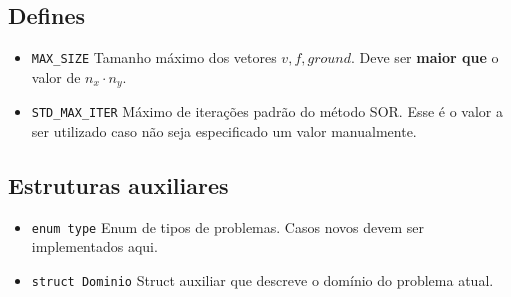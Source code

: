 \documentclass[oneside]{abntex2}
\begin{document}
\subsection{Defines}
\begin{itemize}
    \item \texttt{MAX\_SIZE} \newline
        Tamanho máximo dos vetores $v, f, ground$. Deve ser \textbf{maior que} o valor de $n_x \cdot n_y$.
    \item \texttt{STD\_MAX\_ITER} \newline
        Máximo de iterações padrão do método SOR. Esse é o valor a ser utilizado caso não seja especificado um valor manualmente.
\end{itemize}
\subsection{Estruturas auxiliares}
\begin{itemize}
    \item \texttt{enum type} \newline
        Enum de tipos de problemas. Casos novos devem ser implementados aqui.
    \item \texttt{struct Dominio} \newline
        Struct auxiliar que descreve o domínio do problema atual.
\end{itemize}
\end{document}
